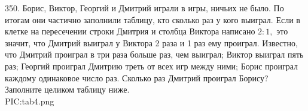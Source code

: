 350. Борис, Виктор, Георгий и Дмитрий играли в игры, ничьих не было. По итогам они частично заполнили таблицу, кто сколько раз у кого выиграл. Если в клетке на пересечении строки Дмитрия и столбца Виктора написано $2:1,$ это значит, что Дмитрий выиграл у Виктора 2 раза и 1 раз ему проиграл. Известно, что Дмитрий проиграл в три раза больше раз, чем выиграл; Виктор выиграл пять раз; Георгий проиграл Дмитрию треть от всех игр между ними; Борис проиграл каждому одинаковое число раз. Сколько раз Дмитрий проиграл Борису? Заполните целиком таблицу ниже.\\
{{PIC:tab4.png}}\\

